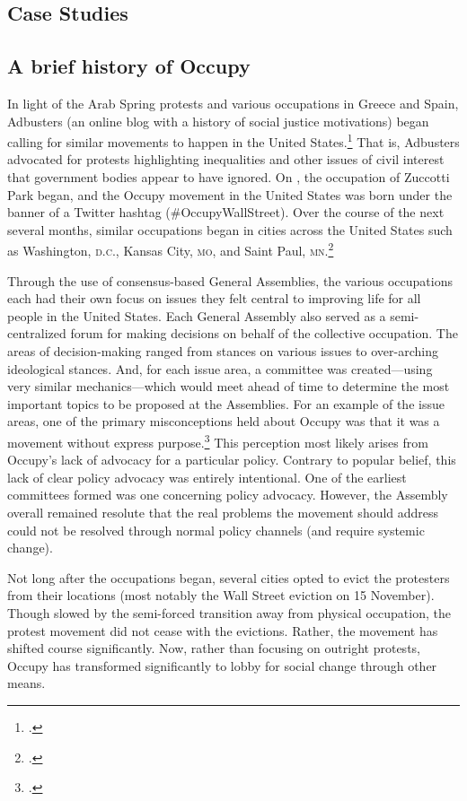 \documentclass[openany,twoside]{memoir}
\begin{document}
\begin{Spacing}{2}
\chapter{Case Studies}
\thispagestyle{fancy}
\section{A brief history of Occupy}
In light of the Arab Spring protests and various occupations in Greece and Spain, Adbusters (an online blog with a history of social justice motivations) began calling for similar movements to happen in the United States.\footcite{adbusters11}
That is, Adbusters advocated for protests highlighting inequalities and other issues of civil interest that government bodies appear to have ignored.
On , the occupation of Zuccotti Park began, and the Occupy movement in the United States was born under the banner of a Twitter hashtag (\#OccupyWallStreet).
Over the course of the next several months, similar occupations began in cities across the United States such as Washington, \textsc{d.c.}, Kansas City, \textsc{mo}, and Saint Paul, \textsc{mn}.\footcite[For a list of Occupy locations, see ][]{wikipedia14} 

Through the use of consensus-based General Assemblies, the various occupations each had their own focus on issues they felt central to improving life for all people in the United States.
Each General Assembly also served as a semi-centralized forum for making decisions on behalf of the collective occupation.
The areas of decision-making ranged from stances on various issues to over-arching ideological stances.
And, for each issue area, a committee was created---using very similar mechanics---which would meet ahead of time to determine the most important topics to be proposed at the Assemblies.
For an example of the issue areas, one of the primary misconceptions held about Occupy was that it was a movement without express purpose.\footcite{rice11}
This perception most likely arises from Occupy's lack of advocacy for a particular policy.
Contrary to popular belief, this lack of clear policy advocacy was entirely intentional.
One of the earliest committees formed was one concerning policy advocacy.
However, the Assembly overall remained resolute that the real problems the movement should address could not be resolved through normal policy channels (and require systemic change).

Not long after the occupations began, several cities opted to evict the protesters from their locations (most notably the Wall Street eviction on 15 November).
Though slowed by the semi-forced transition away from physical occupation, the protest movement did not cease with the evictions.
Rather, the movement has shifted course significantly.
Now, rather than focusing on outright protests, Occupy has transformed significantly to lobby for social change through other means.


\end{Spacing}
\end{document}
